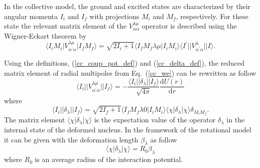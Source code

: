 \documentclass[
12pt, %
oneside, %
english, %
doublespacing, %
doublespacing, %
toctotoc, %
parskip, %
headsepline, %
]{MastersDoctoralThesis} %
\begin{document}
In the collective model, the ground and excited states are characterized by their angular momenta $I_i$ and $I_{f}$ with projections $M_i$ and $M_{f}$, respectively. For these state the relevant matrix element of the $V_{\alpha \alpha}^{\lambda \mu}$ operator is described using the Wigner-Eckart theorem by
\begin{equation}
\langle I_{i} M_{i} \vert V^{\lambda \mu}_{\alpha^{\prime} \alpha}  \vert I_f M_f \rangle 
= \sqrt{2I_i + 1} 
\langle I_f M_f \lambda \mu \vert I_i M_i\rangle
 \langle I^{\prime} \vert \vert V^{\lambda}_{\alpha^{\prime} \alpha} \vert \vert	 I \rangle.
 \label{cc_we}
\end{equation} 

Using the definitions, (\ref{cc_coup_pot_def}) and (\ref{cc_delta_def}), the reduced matrix element of radial multipoles from Eq.~(\ref{cc_we}) can be rewritten as follow 
 \begin{equation}
 \langle I_{i} \vert \vert V^{\lambda \mu}_{\alpha^{\prime} \alpha}  \vert \vert I_f \rangle = -\frac{\langle I_{i} \vert \vert \delta_\lambda \vert \vert I_f \rangle}{\sqrt{4 \pi}} 
 \frac{\text{d}U(r)}{\text{d}r}
 \end{equation}
 where 
\begin{equation}
\langle I_{i} \vert \vert \delta_\lambda \vert \vert I_f \rangle = \sqrt{2 I_f+1} 
\langle I_f M_f \lambda 0 \vert I_i M_i \rangle 
\langle \chi \vert \delta_\lambda \vert \chi \rangle \delta_{M_i M_f}.
\end{equation}
The matrix element $\langle \chi \vert \delta_\lambda \vert \chi \rangle$ is the expectation value of the operator $\delta_\lambda$ in the internal state of the  deformed nucleus. In the framework of the rotational model it can be given with the deformation length $\beta_\lambda$ as follow
\begin{equation}
\langle \chi \vert \delta_\lambda \vert \chi \rangle = R_0 \beta_\lambda
\end{equation}
where $R_0$ is an average radius of the interaction potential.
\end{document}
